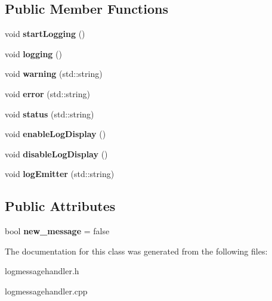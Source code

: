 \subsection*{Public Member Functions}
\begin{DoxyCompactItemize}
\item 
\mbox{\label{classlogmessagehandler_a91d1d1262bd5525cab0c198fdf7d41e5}} 
void {\bfseries start\+Logging} ()
\item 
\mbox{\label{classlogmessagehandler_a01c23467210a9b1826bf10a08b5a39f6}} 
void {\bfseries logging} ()
\item 
\mbox{\label{classlogmessagehandler_acc17fea74d3106b45f2f2c20f10a80e5}} 
void {\bfseries warning} (std\+::string)
\item 
\mbox{\label{classlogmessagehandler_aea916a422758518551f9a27f0d6ca8db}} 
void {\bfseries error} (std\+::string)
\item 
\mbox{\label{classlogmessagehandler_abfe48576834b5c1ed426020270a31936}} 
void {\bfseries status} (std\+::string)
\item 
\mbox{\label{classlogmessagehandler_ad6296ea2dbe642f1ab409bb84ea62245}} 
void {\bfseries enable\+Log\+Display} ()
\item 
\mbox{\label{classlogmessagehandler_ac576ec2d2c498ec6493ee0463953d46c}} 
void {\bfseries disable\+Log\+Display} ()
\item 
\mbox{\label{classlogmessagehandler_a3a9514035a6a79c152946787bde7d74b}} 
void {\bfseries log\+Emitter} (std\+::string)
\end{DoxyCompactItemize}
\subsection*{Public Attributes}
\begin{DoxyCompactItemize}
\item 
\mbox{\label{classlogmessagehandler_a211b3b92b3eabbd6b8be52ee581172a6}} 
bool {\bfseries new\+\_\+message} = false
\end{DoxyCompactItemize}


The documentation for this class was generated from the following files\+:\begin{DoxyCompactItemize}
\item 
logmessagehandler.\+h\item 
logmessagehandler.\+cpp\end{DoxyCompactItemize}
